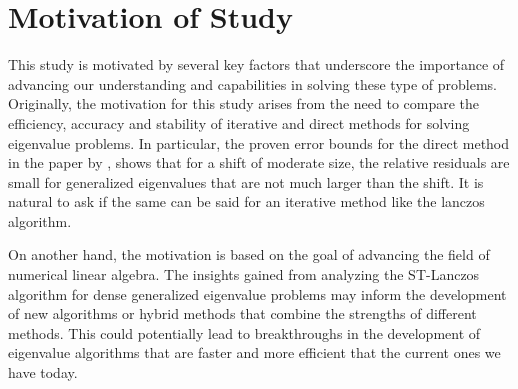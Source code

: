\section{Motivation of Study}\label{sec:MoitavationOfStudy}
This study is motivated by several key factors that underscore the importance of advancing our understanding and capabilities in solving these type of problems. Originally, the motivation for this study arises from the need to compare the efficiency, accuracy and stability of iterative and direct methods for solving eigenvalue problems. In particular, the proven error bounds for the direct method in the paper by \cite{stewart2024spectraltransformationdensesymmetric}, shows that for a shift of moderate size, the relative residuals are small for generalized eigenvalues that are not much larger than the shift. It is natural to ask if the same can be said for an iterative method like the lanczos algorithm.

On another hand, the motivation is based on the goal of advancing the field of numerical linear algebra. The insights gained from analyzing the ST-Lanczos algorithm for dense generalized eigenvalue problems may inform the development of new algorithms or hybrid methods that combine the strengths of different methods. This could potentially lead to breakthroughs in the development of eigenvalue algorithms that are faster and more efficient that the current ones we have today.

